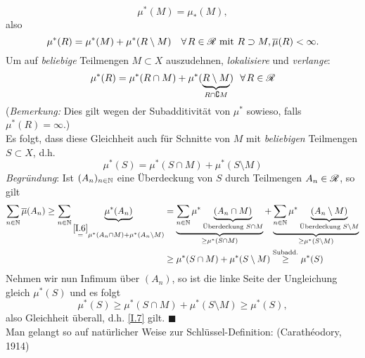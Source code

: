 $$
\mu^*(M)=\mu_*(M),
$$
also
$$
\mu^*(R)=\mu^*(M)+\mu^*(R\setminus M)		\quad \forall R \in \RR \text{ mit } R \supset M, \ol\mu(R)<\infty.
$$
Um auf \emph{beliebige} Teilmengen $M\subset X$ auszudehnen, \emph{lokalisiere} und \emph{verlange}:
\begin{equation}\label{I.6}
\mu^*(R)=\mu^*(R\cap M) + \mu^*(\underbrace{R\setminus M}_{R\cap \complement M}) \ \ \forall R \in \RR
\end{equation}
(\textit{Bemerkung:} Dies gilt wegen der Subadditivität von $\mu^*$ sowieso, falls $\mu^*(R)=\infty$.)\\
Es folgt, dass diese Gleichheit auch für Schnitte von $M$ mit \emph{beliebigen} Teilmengen $S \subset X$, d.h.
\begin{equation}\label{I.7}
\boxed{
\mu^*(S)=\mu^*(S\cap M) + \mu^*(S \setminus M)
}
\end{equation}
\textit{Begründung}: Ist $(A_n)_{n \in \mathbb{N}}$ eine Überdeckung von $S$ durch Teilmengen $A_n \in \mathscr{R}$, so gilt 
\begin{equation*}
\begin{split}
\sum_{n\in\mathbb{N}}\overline\mu(A_n) \geq \sum_{n\in\mathbb{N}}\underbrace{\mu^*(A_n)}_{\overset{\eqref{I.6}}= \mu^*(A_n \cap M)+\mu^*(A_n \setminus M)} & = \underbrace{\sum_{n\in\mathbb{N}}\mu^*\underbrace{(A_n \cap M)}_{\text{Überdeckung } S\cap M}}_{\geq \mu^*(S\cap M)}+\underbrace{\sum_{n\in \mathbb{N}}\mu^*\underbrace{(A_n\setminus M)}_{\text{Überdeckung }S\setminus M}}_{\geq \mu^*(S\setminus M)} \\
& \geq  \mu^*(S\cap M) + \mu^*(S \setminus M) \overset{\text{Subadd.}}{\geq} \mu^*(S)
\end{split}
\end{equation*}
Nehmen wir nun Infimum über $(A_n)$, so ist die linke Seite der Ungleichung gleich $\mu^*(S)$ und es folgt
$$\mu^*(S)\geq \mu^*(S\cap M) + \mu^*(S \setminus M) \geq \mu^*(S),$$
also Gleichheit überall, d.h. \eqref{I.7} gilt. \hfill $\blacksquare$\\

Man gelangt so auf natürlicher Weise zur Schlüssel-Definition: (Carathéodory, 1914)

